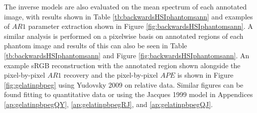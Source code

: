 The inverse models are also evaluated on the mean spectrum of each annotated image, with results shown in Table \ref{tb:backwardsHSIphantomsann} and examples of $AR1$ parameter extraction shown in Figure \ref{fig:backwardsHSIphantomsann}. A similar analysis is performed on a pixelwise basis on annotated regions of each phantom image and results of this can also be seen in Table \ref{tb:backwardsHSIphantomsann} and Figure \ref{fig:backwardsHSIphantomsann}.
An example sRGB reconstruction with the annotated region shown alongside the pixel-by-pixel $AR1$ recovery and the pixel-by-pixel $APE$ is shown in Figure \ref{fig:gelatinpbpeg} using Yudovsky 2009 on relative data. Similar figures can be found fitting to quantitative data or using the Jacques 1999 model in Appendices \ref{ap:gelatinpbpegQY}, \ref{ap:gelatinpbpegRJ}, and \ref{ap:gelatinpbpegQJ}.

